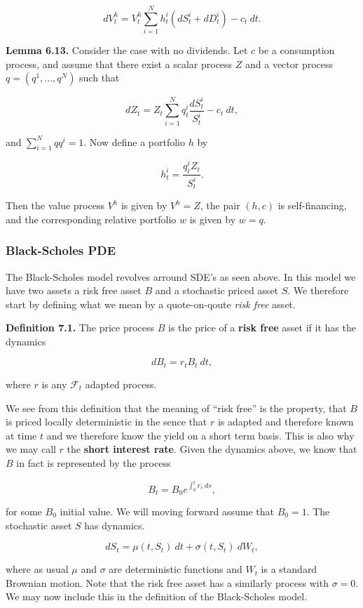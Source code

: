 \documentclass[
]{article}
\begin{document}
\[
dV_t^h=V_t^h\sum_{i=1}^N h_t^i(dS_t^i+dD_t^i)-c_t\ dt.
\]

\textbf{Lemma 6.13.} Consider the case with no dividends. Let \(c\) be a
consumption process, and assume that there exist a scalar process \(Z\)
and a vector process \(q=(q^1,...,q^N)\) such that

\[
dZ_t=Z_t\sum_{i=1}^N q_t^i\frac{dS_t^i}{S_t^i}-c_t\ dt,
\]

and \(\sum_{i=1}^Nqq^i=1\). Now define a portfolio \(h\) by

\[
h_t^i=\frac{q_t^iZ_t}{S_t^i}.
\]

Then the value process \(V^h\) is given by \(V^h=Z\), the pair \((h,c)\)
is self-financing, and the corresponding relative portfolio \(w\) is
given by \(w=q\).

\hypertarget{black-scholes-pde}{%
\subsubsection{Black-Scholes PDE}\label{black-scholes-pde}}

The Black-Scholes model revolves arround SDE's as seen above. In this
model we have two assets a risk free asset \(B\) and a stochastic priced
asset \(S\). We therefore start by defining what we mean by a
quote-on-qoute \emph{risk free} asset.

\textbf{Definition 7.1.} The price process \(B\) is the price of a
\textbf{risk free} asset if it has the dynamics

\[
dB_t=r_t B_t\ dt,
\]

where \(r\) is any \(\mathcal{F}_t\) adapted process.

We see from this definition that the meaning of ``risk free'' is the
property, that \(B\) is priced locally deterministic in the sence that
\(r\) is adapted and therefore known at time \(t\) and we therefore know
the yield on a short term basis. This is also why we may call \(r\) the
\textbf{short interest rate}. Given the dynamics above, we know that
\(B\) in fact is represented by the process

\[
B_t=B_0e^{\int_0^tr_s\ ds},
\]

for some \(B_0\) initial value. We will moving forward assume that
\(B_0=1\). The stochastic asset \(S\) has dynamics.

\[
dS_t=\mu(t,S_t)\ dt + \sigma(t,S_t)\ dW_t,
\]

where as usual \(\mu\) and \(\sigma\) are deterministic functions and
\(W_t\) is a standard Brownian motion. Note that the risk free asset has
a similarly process with \(\sigma = 0\). We may now include this in the
definition of the Black-Scholes model.
\end{document}
